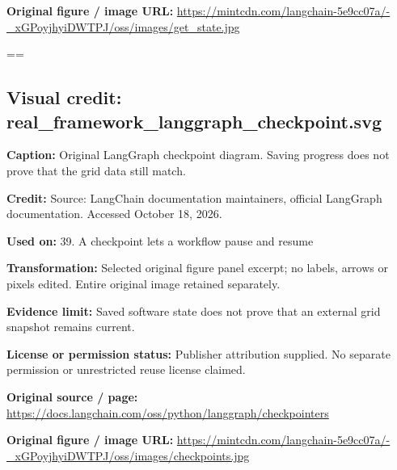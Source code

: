 \documentclass[10pt,letterpaper]{article}
\begin{document}
\textbf{Original figure / image URL:} \href{https://mintcdn.com/langchain-5e9cc07a/-_xGPoyjhyiDWTPJ/oss/images/get_state.jpg}{\small\ttfamily https:/\allowbreak{}/\allowbreak{}mintcdn.\allowbreak{}com/\allowbreak{}langchain-\allowbreak{}5e9cc07a/\allowbreak{}-\allowbreak{}\_\allowbreak{}xGPoyjhyiDWTPJ/\allowbreak{}oss/\allowbreak{}images/\allowbreak{}get\_\allowbreak{}state.\allowbreak{}jpg}\par
\egroup\par\noindent\box\readingEntry\par\medskip
\setbox\readingEntry=\vbox\bgroup\hsize=\linewidth\subsection*{Visual credit: real\_framework\_langgraph\_checkpoint.svg}
\textbf{Caption:} Original LangGraph checkpoint diagram. Saving progress does not prove that the grid data still match.\par
\textbf{Credit:} Source: LangChain documentation maintainers, official LangGraph documentation. Accessed October 18, 2026.\par
\textbf{Used on:} 39. A checkpoint lets a workflow pause and resume\par
\textbf{Transformation:} Selected original figure panel excerpt; no labels, arrows or pixels edited. Entire original image retained separately.\par
\textbf{Evidence limit:} Saved software state does not prove that an external grid snapshot remains current.\par
\textbf{License or permission status:} Publisher attribution supplied. No separate permission or unrestricted reuse license claimed.\par
\textbf{Original source / page:} \href{https://docs.langchain.com/oss/python/langgraph/checkpointers}{\small\ttfamily https:/\allowbreak{}/\allowbreak{}docs.\allowbreak{}langchain.\allowbreak{}com/\allowbreak{}oss/\allowbreak{}python/\allowbreak{}langgraph/\allowbreak{}checkpointers}\par
\textbf{Original figure / image URL:} \href{https://mintcdn.com/langchain-5e9cc07a/-_xGPoyjhyiDWTPJ/oss/images/checkpoints.jpg}{\small\ttfamily https:/\allowbreak{}/\allowbreak{}mintcdn.\allowbreak{}com/\allowbreak{}langchain-\allowbreak{}5e9cc07a/\allowbreak{}-\allowbreak{}\_\allowbreak{}xGPoyjhyiDWTPJ/\allowbreak{}oss/\allowbreak{}images/\allowbreak{}checkpoints.\allowbreak{}jpg}\par
\egroup\par\noindent\box\readingEntry\par\medskip
\end{document}
